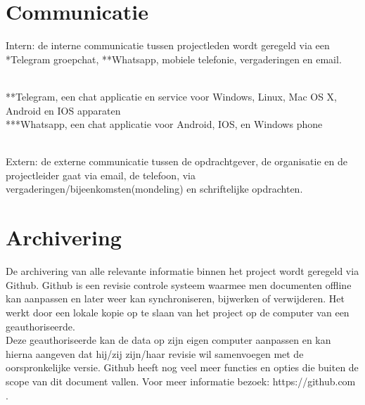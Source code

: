 \documentclass[oneside]{book}
\begin{document}
\section*{Communicatie}
{\color{red}Intern: de interne communicatie tussen projectleden wordt geregeld via een *Telegram groepchat,
**Whatsapp, mobiele telefonie, vergaderingen en email.}\\
\\
\begin{small}
**Telegram, een chat applicatie en service voor Windows, Linux, Mac OS X, Android en IOS apparaten\\
***Whatsapp, een chat applicatie voor Android, IOS, en Windows phone\\
\end{small}
\\
{\color{red}Extern: de externe communicatie tussen de opdrachtgever, de organisatie en de projectleider gaat via email,
de telefoon, via vergaderingen/bijeenkomsten(mondeling) en schriftelijke opdrachten.}

\section*{Archivering}
De archivering van alle relevante informatie binnen het project wordt geregeld via Github.
Github is een revisie controle systeem waarmee men documenten offline kan aanpassen en
later weer kan synchroniseren, bijwerken of verwijderen.
Het werkt door een lokale kopie op te slaan van het project op de computer van een
geauthoriseerde.\\
Deze geauthoriseerde kan de data op zijn eigen computer aanpassen en kan hierna aangeven dat
hij/zij zijn/haar revisie wil samenvoegen met de oorspronkelijke versie.
Github heeft nog veel meer functies en opties die buiten de scope van dit document vallen.
Voor meer informatie bezoek: https://github.com .
\end{document}
